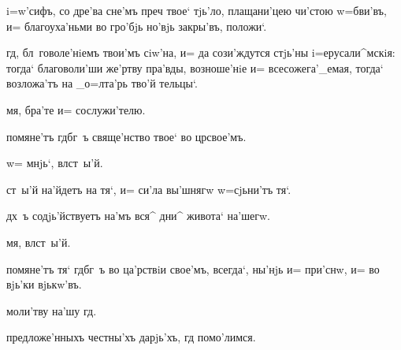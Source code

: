  i=w'сифъ, со дре'ва сне'мъ преч 
твое` тjь'ло, плащани'цею чи'стою w=бви'въ, и= 
благоуха'ньми во гро'бjь но'вjь закры'въ, положи`.


 гд, бл~говоле'нiемъ твои'мъ сiw'на, и= 
да сози'ждутся стjь'ны i=ерусали^мскiя: тогда` 
благоволи'ши же'ртву пра'вды, возноше'нiе и= 
всесожега'_емая, тогда` возложа'тъ на _о=лта'рь тво'й 
тельцы`.


 мя, бра'те и= сослужи'телю.

     помяне'тъ гд бг~ъ 
свяще'нство твое` во цр свое'мъ.


 w= мнjь`, вл ст~ы'й.

   ст~ы'й на'йдетъ на тя`, и= си'ла 
вы'шнягw w=сjьни'тъ тя`.

   дх~ъ содjь'йствуетъ на'мъ вся^ 
дни^ живота` на'шегw.

    мя, вл ст~ы'й.

   помяне'тъ тя` гд бг~ъ во 
ца'рствiи свое'мъ, всегда`, ны'нjь и= при'снw, и= во 
вjь'ки вjькw'въ.

    

 моли'тву на'шу гд.


 предложе'нныхъ честны'хъ дарjь'хъ, гд 
помо'лимся.



